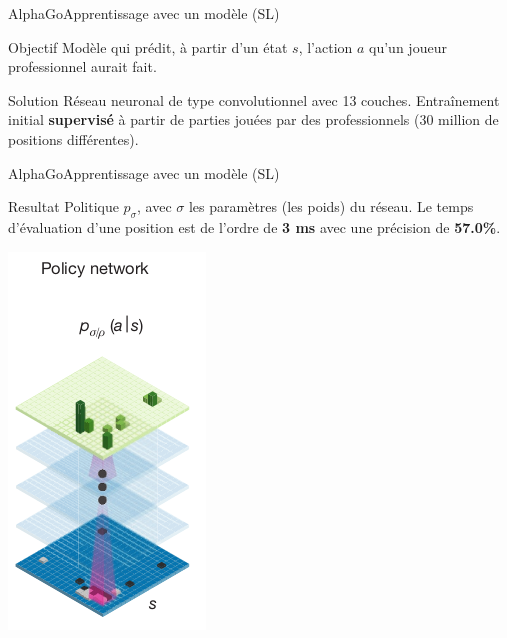 \begin{frame}{AlphaGo}{Apprentissage avec un modèle (SL)}
    \begin{center}

        \begin{block}{Objectif}
            Modèle qui prédit, à partir d'un état $s$, l'action $a$ qu'un joueur professionnel aurait fait.
        \end{block}
        \vspace{1cm}
        \begin{block}{Solution}
            Réseau neuronal de type convolutionnel avec 13 couches.
            Entraînement initial \textbf{supervisé} à partir de parties jouées par des professionnels (30 million de positions différentes).
        \end{block}
    \end{center}
\end{frame}

\begin{frame}{AlphaGo}{Apprentissage avec un modèle (SL)}
    \begin{block}{Resultat}
        Politique $p_\sigma$, avec $\sigma$ les paramètres (les poids) du réseau.
        Le temps d'évaluation d'une position est de l'ordre de \textbf{3 ms} avec une précision de \textbf{57.0\%}.
    \end{block}
    \begin{center}
        \includegraphics[scale=0.4]{ressources/AlphaGo/Policy_Network}
    \end{center}
\end{frame}

